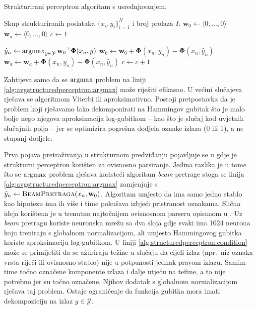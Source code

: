 \begin{algorithm}
\caption{Strukturirani perceptron algoritam s usrednjavanjem.}
\label{alg:avgstructuredperceptron}
\begin{algorithmic}[1]
\Require Skup strukturiranih podataka $\{x_i, y_i\}_{i=1}^N$ i broj prolaza $I$.
\State $\mathbf{w}_0 \gets \langle 0, \ldots, 0 \rangle$
\State $\mathbf{w}_a \gets \langle 0, \ldots, 0 \rangle$
\State $c \gets 1$

    \State $\hat{y}_n \gets \operatorname*{argmax}_{y \in \mathcal{Y}} {\mathbf{w}_0}^\top \mathbf{\Phi}(x_n, y)$ \label{alg:avgstructuredperceptron:argmax}
    \label{alg:structuredperceptron:condition}
    \State $\mathbf{w}_0 \gets \mathbf{w}_0 + \mathbf{\Phi}(x_n, y_n) - \mathbf{\Phi}(x_n, \hat{y}_n)$
    \State $\mathbf{w}_a \gets \mathbf{w}_a + \mathbf{\Phi}(x_n, y_n) - \mathbf{\Phi}(x_n, \hat{y}_n)$
    \EndIf
    \State $c \gets c + 1$
  \EndFor

\EndFor

\State {}
\end{algorithmic}
\end{algorithm}

Zahtijeva samo da se $\operatorname*{argmax}$ problem na liniji
\ref{alg:avgstructuredperceptron:argmax} može riješiti efikasno. U većini
slučajeva rješava se algoritmom Viterbi ili aproksimativno. Postoji pretpostavka
da je problem koji rješavamo lako dekomponirati na Hammingov gubitak što je malo
bolje nego njegova aproksimacija log-gubitkom -- kao što je slučaj kod uvjetnih
slučajnih polja -- jer se optimizira pogrešna dodjela oznake izlaza (0 ili 1), a
ne stupanj dodjele.

Prva pojava pretraživanja u strukturnom predviđanju pojavljuje se u
\citep{collins2004incremental} gdje je strukturni perceptron korišten za
ovisnosno parsiranje. Jedina razlika je u tome što se $\operatorname*{argmax}$ problem rješava
koristeći algoritam \textit{beam} pretrage stoga se linija
\ref{alg:avgstructuredperceptron:argmax} zamjenjuje s $\hat{y}_n \gets
\textsc{BeamPretraga}(x_n, \mathbf{w}_0)$. Algoritam umjesto da ima samo jedno
stablo kao hipotezu ima ih više i time pokušava izbjeći pristranost oznakama.
Slična ideja korištena je u trenutno najtočnijem ovisnosnom parseru opisanom u
\citep{andor2016globally}. Uz \textit{beam} pretragu koriste neuronsku mrežu sa
dva sloja gdje svaki ima 1024 neurona koju treniraju s globalnom normalizacijom,
ali umjesto Hammingovog gubitka koriste aproksimaciju log-gubitkom. U liniji
\ref{alg:structuredperceptron:condition} može se primijetiti da se ažuriraju
težine u slučaju da cijeli izlaz (npr.~niz oznaka vrsta riječi ili ovisnosno
stablo) nije u potpunosti jednak pravom izlazu. Samim time točno označene
komponente izlaza i dalje utječu na težine, a to nije potrebno jer su točno
označene. Njihov dodatak s globalnom normalizacijom rješava taj problem. Ostaje
ograničenje da funkcija gubitka mora imati dekompoziciju na izlaz $y \in
\mathcal{Y}$.
